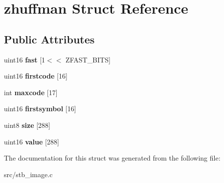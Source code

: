\hypertarget{structzhuffman}{}\section{zhuffman Struct Reference}
\label{structzhuffman}
\subsection*{Public Attributes}
\begin{DoxyCompactItemize}
\item 
\hypertarget{structzhuffman_a12d5f92a121b65680e5f0b4027d00c96}{}uint16 {\bfseries fast} \mbox{[}1$<$$<$ Z\+F\+A\+S\+T\+\_\+\+B\+I\+T\+S\mbox{]}\label{structzhuffman_a12d5f92a121b65680e5f0b4027d00c96}

\item 
\hypertarget{structzhuffman_a81f5ae5bd31b40439955de6154572917}{}uint16 {\bfseries firstcode} \mbox{[}16\mbox{]}\label{structzhuffman_a81f5ae5bd31b40439955de6154572917}

\item 
\hypertarget{structzhuffman_ac7dd4a2bf01a6e27933dd1cf6b0cc762}{}int {\bfseries maxcode} \mbox{[}17\mbox{]}\label{structzhuffman_ac7dd4a2bf01a6e27933dd1cf6b0cc762}

\item 
\hypertarget{structzhuffman_afbdb21fd99f413fc8f9e58243552fe95}{}uint16 {\bfseries firstsymbol} \mbox{[}16\mbox{]}\label{structzhuffman_afbdb21fd99f413fc8f9e58243552fe95}

\item 
\hypertarget{structzhuffman_a46ce4d4a4d7fc41c2560616f6696e9b9}{}uint8 {\bfseries size} \mbox{[}288\mbox{]}\label{structzhuffman_a46ce4d4a4d7fc41c2560616f6696e9b9}

\item 
\hypertarget{structzhuffman_acc395b638b700b944c329d71a8b82084}{}uint16 {\bfseries value} \mbox{[}288\mbox{]}\label{structzhuffman_acc395b638b700b944c329d71a8b82084}

\end{DoxyCompactItemize}


The documentation for this struct was generated from the following file\+:\begin{DoxyCompactItemize}
\item 
src/stb\+\_\+image.\+c\end{DoxyCompactItemize}
